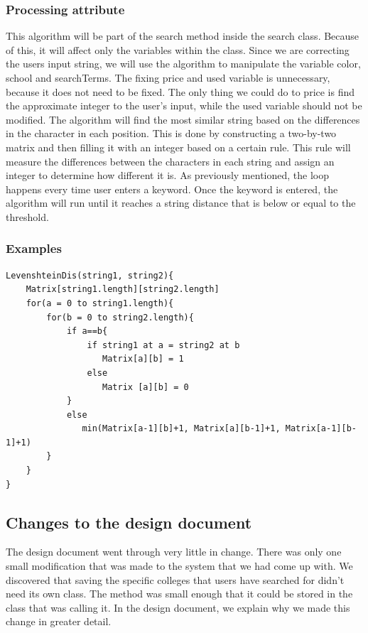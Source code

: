 \documentclass[journal,compsoc, 10pt, draftclsnofoot, onecolumn]{IEEEtran}
\begin{document}
\subsubsection*{Processing attribute}
This algorithm will be part of the search method inside the search class. 
Because of this, it will affect only the variables within the class. 
Since we are correcting the users input string, we will use the algorithm to 
manipulate the variable color, school and searchTerms. The fixing price and used 
variable is unnecessary, because it does not need to be fixed. The only thing 
we could do to price is find the approximate integer to the user's input, while 
the used variable should not be modified. The algorithm will find the most 
similar string based on the differences in the character in each position. 
This is done by constructing a two-by-two matrix and then filling it with an 
integer based on a certain rule. This rule will measure the differences 
between the characters in each string and assign an integer to determine how 
different it is. As previously mentioned, the loop happens every time user 
enters a keyword. Once the keyword is entered, the algorithm will run until 
it reaches a string distance that is below or equal to the threshold.

\subsubsection*{Examples}
\begin{lstlisting}
LevenshteinDis(string1, string2){
	Matrix[string1.length][string2.length]
	for(a = 0 to string1.length){
		for(b = 0 to string2.length){
			if a==b{
				if string1 at a = string2 at b
				   Matrix[a][b] = 1
				else 
				   Matrix [a][b] = 0
			}
			else 
			   min(Matrix[a-1][b]+1, Matrix[a][b-1]+1, Matrix[a-1][b-1]+1)
		}
	}
}
\end{lstlisting}

\subsection{Changes to the design document}
The design document went through very little in change. There was only one small modification
that was made to the system that we had come up with. We discovered that saving the specific
colleges that users have searched for didn't need its own class. The method was small enough
that it could be stored in the class that was calling it. In the design document, we explain
why we made this change in greater detail.
\end{document}
